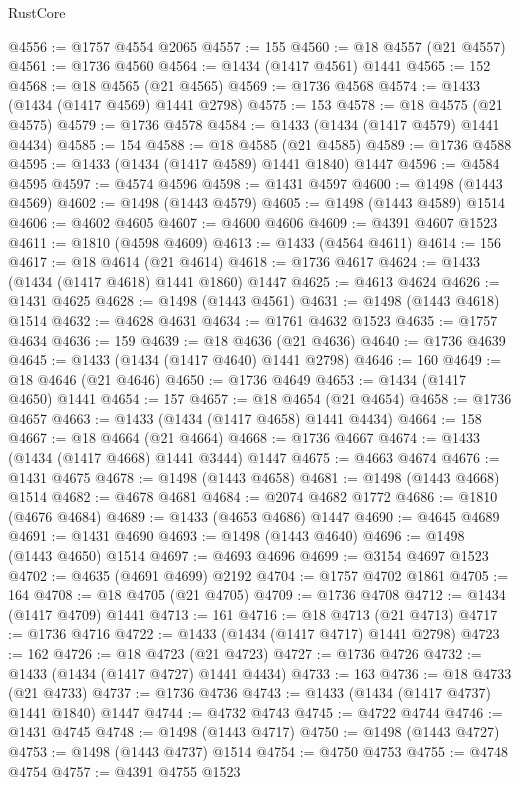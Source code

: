 \begin{lexlean}{RustCore}
\begin{coremodule}
@4556 := @1757 @4554 @2065
@4557 := 155
@4560 := @18 @4557 (@21 @4557)
@4561 := @1736 @4560
@4564 := @1434 (@1417 @4561) @1441
@4565 := 152
@4568 := @18 @4565 (@21 @4565)
@4569 := @1736 @4568
@4574 := @1433 (@1434 (@1417 @4569) @1441 @2798)
@4575 := 153
@4578 := @18 @4575 (@21 @4575)
@4579 := @1736 @4578
@4584 := @1433 (@1434 (@1417 @4579) @1441 @4434)
@4585 := 154
@4588 := @18 @4585 (@21 @4585)
@4589 := @1736 @4588
@4595 := @1433 (@1434 (@1417 @4589) @1441 @1840) @1447
@4596 := @4584 @4595
@4597 := @4574 @4596
@4598 := @1431 @4597
@4600 := @1498 (@1443 @4569)
@4602 := @1498 (@1443 @4579)
@4605 := @1498 (@1443 @4589) @1514
@4606 := @4602 @4605
@4607 := @4600 @4606
@4609 := @4391 @4607 @1523
@4611 := @1810 (@4598 @4609)
@4613 := @1433 (@4564 @4611)
@4614 := 156
@4617 := @18 @4614 (@21 @4614)
@4618 := @1736 @4617
@4624 := @1433 (@1434 (@1417 @4618) @1441 @1860) @1447
@4625 := @4613 @4624
@4626 := @1431 @4625
@4628 := @1498 (@1443 @4561)
@4631 := @1498 (@1443 @4618) @1514
@4632 := @4628 @4631
@4634 := @1761 @4632 @1523
@4635 := @1757 @4634
@4636 := 159
@4639 := @18 @4636 (@21 @4636)
@4640 := @1736 @4639
@4645 := @1433 (@1434 (@1417 @4640) @1441 @2798)
@4646 := 160
@4649 := @18 @4646 (@21 @4646)
@4650 := @1736 @4649
@4653 := @1434 (@1417 @4650) @1441
@4654 := 157
@4657 := @18 @4654 (@21 @4654)
@4658 := @1736 @4657
@4663 := @1433 (@1434 (@1417 @4658) @1441 @4434)
@4664 := 158
@4667 := @18 @4664 (@21 @4664)
@4668 := @1736 @4667
@4674 := @1433 (@1434 (@1417 @4668) @1441 @3444) @1447
@4675 := @4663 @4674
@4676 := @1431 @4675
@4678 := @1498 (@1443 @4658)
@4681 := @1498 (@1443 @4668) @1514
@4682 := @4678 @4681
@4684 := @2074 @4682 @1772
@4686 := @1810 (@4676 @4684)
@4689 := @1433 (@4653 @4686) @1447
@4690 := @4645 @4689
@4691 := @1431 @4690
@4693 := @1498 (@1443 @4640)
@4696 := @1498 (@1443 @4650) @1514
@4697 := @4693 @4696
@4699 := @3154 @4697 @1523
@4702 := @4635 (@4691 @4699) @2192
@4704 := @1757 @4702 @1861
@4705 := 164
@4708 := @18 @4705 (@21 @4705)
@4709 := @1736 @4708
@4712 := @1434 (@1417 @4709) @1441
@4713 := 161
@4716 := @18 @4713 (@21 @4713)
@4717 := @1736 @4716
@4722 := @1433 (@1434 (@1417 @4717) @1441 @2798)
@4723 := 162
@4726 := @18 @4723 (@21 @4723)
@4727 := @1736 @4726
@4732 := @1433 (@1434 (@1417 @4727) @1441 @4434)
@4733 := 163
@4736 := @18 @4733 (@21 @4733)
@4737 := @1736 @4736
@4743 := @1433 (@1434 (@1417 @4737) @1441 @1840) @1447
@4744 := @4732 @4743
@4745 := @4722 @4744
@4746 := @1431 @4745
@4748 := @1498 (@1443 @4717)
@4750 := @1498 (@1443 @4727)
@4753 := @1498 (@1443 @4737) @1514
@4754 := @4750 @4753
@4755 := @4748 @4754
@4757 := @4391 @4755 @1523

\end{coremodule}
\end{lexlean}
